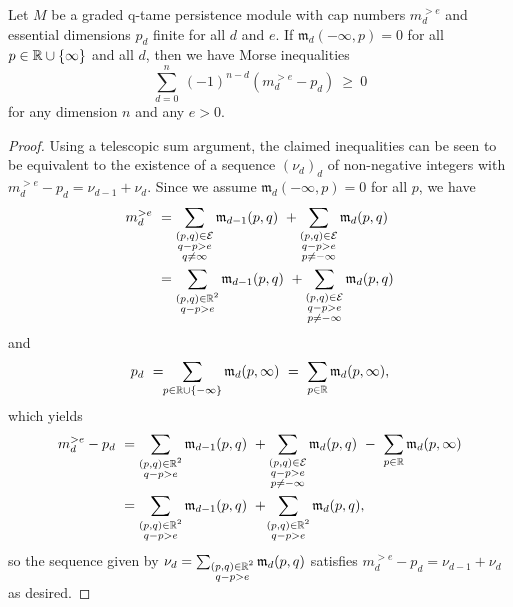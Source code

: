 \begin{thm}\label{t:inequalities}
	Let $M$ be a graded q-tame persistence module with cap numbers $m_{d}^{> e }$ and essential dimensions $p_{d}$ finite for all $d$ and $e$.
	If $\mathfrak{m}_d(-\infty, p) = 0$ for all $p \in \mathbb{R} \cup \{\infty\}$ and all $d$, then we have Morse inequalities
    \begin{equation} \label{e:morse inequalities}
    \sum_{d=0}^n \ (-1)^{n-d} (m^{>e}_{d} - p_{d}) \ \geq\  0
    \end{equation}
    for any dimension $n$ and any $e > 0$.
\end{thm}

\begin{proof}
    Using a telescopic sum argument, the claimed inequalities can be seen to be equivalent to the existence of a sequence $(\nu_d)_d$ of non-negative integers with $m^{>e}_{d} - p_{d} = \nu_{d-1} + \nu_{d}$.
    Since we assume $\mathfrak{m}_d(-\infty, p) = 0$ for all $p$, we have
    \begin{align*}
    m^{>e}_{d}
    \ &=
    \sum_{\substack{(p,q) \in \mathcal{E} \\ q - p > e \\ q \neq \infty}} \mathfrak{m}_{d-1}(p,q)
    \ +
    \sum_{\substack{(p,q) \in \mathcal{E} \\ q - p > e \\ p \neq -\infty}}\mathfrak{m}_d(p,q)
    \\
    &=
    \sum_{\substack{(p,q) \in \mathbb{R}^2 \\ q - p > e }} \mathfrak{m}_{d-1}(p,q)
    \ +
    \sum_{\substack{(p,q) \in \mathcal{E} \\ q - p > e \\ p \neq -\infty}}\mathfrak{m}_d(p,q)
    \end{align*}
    and
    \begin{equation*}
    p_{d}
    \ = \!\!
    \sum_{p \in \mathbb{R} \cup \{-\infty\}} \mathfrak{m}_d(p,\infty)
    \ = \
    \sum_{p \in \mathbb{R}} \mathfrak{m}_d(p,\infty),
    \end{equation*}
    which yields
    \begin{align*}
    m^{>e}_{d} - p_{d} \
    &= 
    \sum_{\substack{(p,q) \in \mathbb{R}^2 \\ q - p > e }} \mathfrak{m}_{d-1}(p,q)
    \ +
    \sum_{\substack{(p,q) \in \mathcal{E} \\ q - p > e \\ p \neq -\infty}}\mathfrak{m}_d(p,q)
    \ - \
    \sum_{p \in \mathbb{R}} \mathfrak{m}_d(p,\infty)
    \\
    &=
    \sum_{\substack{(p,q) \in \mathbb{R}^2 \\ q - p > e }} \mathfrak{m}_{d-1}(p,q)
    \ + \!
    \sum_{\substack{(p,q) \in \mathbb{R}^2 \\ q - p > e }}\mathfrak{m}_d(p,q),
    \end{align*}
    so the sequence given by $\nu_d = \sum_{\substack{(p,q) \in \mathbb{R}^2 \\ q - p > e }}\mathfrak{m}_d(p,q)$ satisfies $m^{>e}_{d} - p_{d} = \nu_{d-1} + \nu_{d}$ as desired.
\end{proof}

